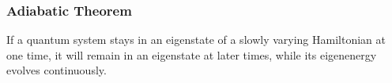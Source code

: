 \documentclass{beamer}
\begin{document}
\begin{frame}
	\frametitle{Adiabatic Theorem}
			If a quantum system stays in an eigenstate of a slowly varying Hamiltonian at one time, it will remain in an eigenstate at later times, while its eigenenergy evolves continuously.\\


\end{frame}
\end{document}
